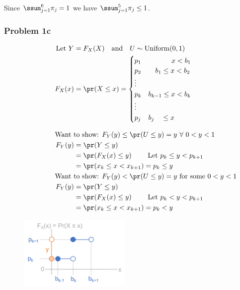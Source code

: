 \documentclass[12pt, letterpaper]{article}
\begin{document}
Since $\ssum_{j=1}^6 \pi_j = 1$ we have $\ssum_{j=1}^5 \pi_j \leq 1$.  

\newpage 
\subsubsection*{Problem 1c}
\begin{align*}
\text{Let } Y & = F_X(X) \quad \text{and} \quad U \sim \text{Uniform}(0, 1) 
\\
F_X(x) &= \pr(X \leq x) = 
\begin{cases} 
p_1 & \ \ \  \quad \quad \  x < b_1 \\
p_2 &\ \ \  b_1 \leq x < b_2 \\
\vdots \\
p_k & b_{k-1} \leq x < b_k \\
\vdots \\
p_j & b_j \ \ \ \leq x 
\end{cases} 
\\[2ex]
\omit\rlap{Want to show: $F_Y(y)  \leq \pr(U \leq y) = y \ \forall \ 0 < y < 1$} \\
F_Y(y) & = \pr( Y \leq y) 
\\
& = \pr( F_X(x) \leq y) \quad \quad \text{ Let $p_k \leq  y < p_{k+1}$} 
\\
& = \pr( x_k \leq x < x_{k+1}) = p_k \leq y 
\\
\omit\rlap{Want to show: $F_Y(y)  < \pr(U \leq y) = y  \text{ for some } 0 < y < 1$}  \\
F_Y(y) & = \pr( Y \leq y) 
\\
& = \pr( F_X(x) \leq y) \quad \quad \text{ Let $p_k <  y < p_{k+1}$} 
\\
& = \pr( x_k \leq x < x_{k+1}) = p_k < y 
\end{align*}

\begin{figure}[h]
	\begin{center}
		\includegraphics[width=0.48\textwidth]{Fig01c}
	\end{center}
\end{figure}
\end{document}
